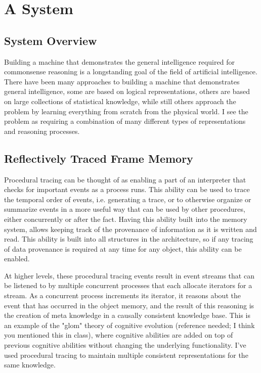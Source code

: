 \chapter{A System}\label{ch:a_system}

\section{System Overview}

Building a machine that demonstrates the general intelligence required
for commonsense reasoning is a longstanding goal of the field of
artificial intelligence.  There have been many approaches to building
a machine that demonstrates general intelligence, some are based on
logical representations, others are based on large collections of
statistical knowledge, while still others approach the problem by
learning everything from scratch from the physical world.  I see the
problem as requiring a combination of many different types of
representations and reasoning processes.



\section{Reflectively Traced Frame Memory}

Procedural tracing can be thought of as enabling a part of an
interpreter that checks for important events as a process runs.  This
ability can be used to trace the temporal order of events, i.e.
generating a trace, or to otherwise organize or summarize events in a
more useful way that can be used by other procedures, either
concurrently or after the fact.  Having this ability built into the
memory system, allows keeping track of the provenance of information as
it is written and read.  This ability is built into all structures in
the architecture, so if any tracing of data provenance is required at
any time for any object, this ability can be enabled.

At higher levels, these procedural tracing events result in event
streams that can be listened to by multiple concurrent processes that
each allocate iterators for a stream.  As a concurrent process
increments its iterator, it reasons about the event that has occurred in
the object memory, and the result of this reasoning is the creation of
meta knowledge in a causally consistent knowledge base.  This is an
example of the "glom" theory of cognitive evolution (reference needed; I
think you mentioned this in class), where cognitive abilities are added
on top of previous cognitive abilities without changing the underlying
functionality.  I've used procedural tracing to maintain multiple
consistent representations for the same knowledge.

